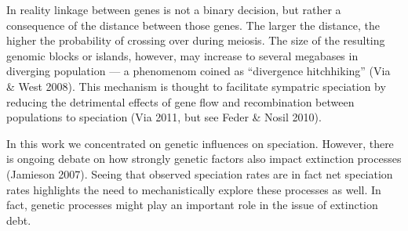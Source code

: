 \documentclass[a4paper]{scrartcl}
\begin{document}
In reality linkage between genes is not a binary decision, but rather a consequence of the distance between those genes.
The larger the distance, the higher the probability of crossing over during meiosis.
The size of the resulting genomic blocks or islands, however, may increase to several megabases in diverging population ---
a phenomenom coined as ``divergence hitchhiking'' (Via \& West 2008). %
This mechanism is thought to facilitate sympatric speciation by reducing the detrimental effects of gene flow and
recombination between populations to speciation (Via 2011, but see Feder \& Nosil 2010).

In this work we concentrated on genetic influences on speciation.
However, there is ongoing debate on how strongly genetic factors also impact extinction processes (Jamieson 2007).
Seeing that observed speciation rates are in fact net speciation rates highlights the need to mechanistically explore
these processes as well.
In fact, genetic processes might play an important role in the issue of extinction debt. %

\printbibliography
\end{document}
